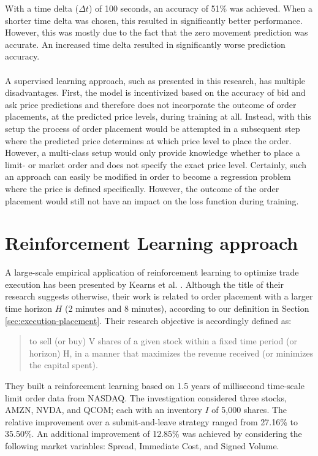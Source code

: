 With a time delta ($\Delta{t}$) of 100 seconds, an accuracy of 51\% was achieved.
When a shorter time delta was chosen, this resulted in significantly better performance. However, this was mostly due to the fact that the zero movement prediction was accurate.
An increased time delta resulted in significantly worse prediction accuracy.
\\
\\
A supervised learning approach, such as presented in this research, has multiple disadvantages.
First, the model is incentivized based on the accuracy of bid and ask price predictions and therefore does not incorporate the outcome of order placements, at the predicted price levels, during training at all.
Instead, with this setup the process of order placement would be attempted in a subsequent step where the predicted price determines at which price level to place the order.
However, a multi-class setup would only provide knowledge whether to place a limit- or market order and does not specify the exact price level.
Certainly, such an approach can easily be modified in order to become a regression problem where the price is defined specifically.
However, the outcome of the order placement would still not have an impact on the loss function during training.

\section{Reinforcement Learning approach}
\label{sec:related-reinforcement}
A large-scale empirical application of reinforcement learning to optimize trade execution has been presented by Kearns et al. \cite{nevmyvaka2006reinforcement}.
Although the title of their research suggests otherwise, their work is related to order placement with a larger time horizon $H$ (2 minutes and 8 minutes), according to our definition in Section \ref{sec:execution-placement}.
Their research objective is accordingly defined as:
\begin{quote}
    to sell (or buy) V shares of a given stock within a fixed time period (or horizon) H, in a manner that maximizes the revenue received (or minimizes the capital spent).
\end{quote}
They built a reinforcement learning based on 1.5 years of millisecond time-scale limit order data from NASDAQ.
The investigation considered three stocks, AMZN, NVDA, and QCOM; each with an inventory $I$ of 5,000 shares.
The relative improvement over a submit-and-leave strategy ranged from 27.16\% to 35.50\%.
An additional improvement of 12.85\% was achieved by considering the following market variables: Spread, Immediate Cost, and Signed Volume.

